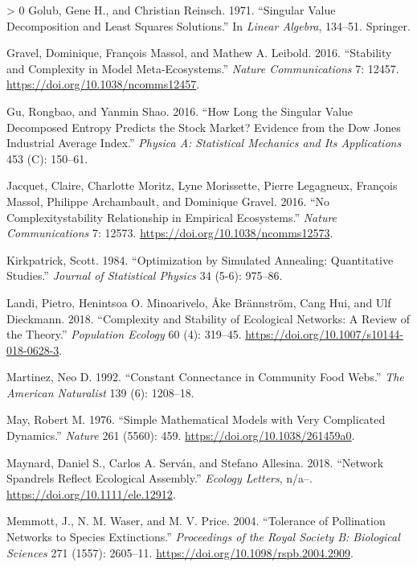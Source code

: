 \documentclass[10pt,oneside]{article}
\newlength{\cslhangindent}
\newenvironment{CSLReferences}[3] %
 {%
  \setlength{\parindent}{0pt}
  \ifodd #1 \everypar{\setlength{\hangindent}{\cslhangindent}}\ignorespaces\fi
  \ifnum #2 > 0
  \setlength{\parskip}{#2\baselineskip}
  \fi
 }%
 {}
\begin{document}
\begin{CSLReferences}{1}{0}
\leavevmode\hypertarget{ref-Golub1971SinVal}{}%
Golub, Gene H., and Christian Reinsch. 1971. {``Singular Value
Decomposition and Least Squares Solutions.''} In \emph{Linear Algebra},
134--51. Springer.

\leavevmode\hypertarget{ref-Gravel2016StaCom}{}%
Gravel, Dominique, François Massol, and Mathew A. Leibold. 2016.
{``Stability and Complexity in Model Meta-Ecosystems.''} \emph{Nature
Communications} 7: 12457. \url{https://doi.org/10.1038/ncomms12457}.

\leavevmode\hypertarget{ref-Gu2016HowLon}{}%
Gu, Rongbao, and Yanmin Shao. 2016. {``How Long the Singular Value
Decomposed Entropy Predicts the Stock Market? Evidence from the Dow
Jones Industrial Average Index.''} \emph{Physica A: Statistical
Mechanics and Its Applications} 453 (C): 150--61.

\leavevmode\hypertarget{ref-Jacquet2016NoCom}{}%
Jacquet, Claire, Charlotte Moritz, Lyne Morissette, Pierre Legagneux,
François Massol, Philippe Archambault, and Dominique Gravel. 2016. {``No
Complexitystability Relationship in Empirical Ecosystems.''}
\emph{Nature Communications} 7: 12573.
\url{https://doi.org/10.1038/ncomms12573}.

\leavevmode\hypertarget{ref-Kirkpatrick1984OptSim}{}%
Kirkpatrick, Scott. 1984. {``Optimization by Simulated Annealing:
Quantitative Studies.''} \emph{Journal of Statistical Physics} 34 (5-6):
975--86.

\leavevmode\hypertarget{ref-Landi2018ComSta}{}%
Landi, Pietro, Henintsoa O. Minoarivelo, Åke Brännström, Cang Hui, and
Ulf Dieckmann. 2018. {``Complexity and Stability of Ecological Networks:
A Review of the Theory.''} \emph{Population Ecology} 60 (4): 319--45.
\url{https://doi.org/10.1007/s10144-018-0628-3}.

\leavevmode\hypertarget{ref-Martinez1992ConCon}{}%
Martinez, Neo D. 1992. {``Constant Connectance in Community Food
Webs.''} \emph{The American Naturalist} 139 (6): 1208--18.

\leavevmode\hypertarget{ref-May1976SimMat}{}%
May, Robert M. 1976. {``Simple Mathematical Models with Very Complicated
Dynamics.''} \emph{Nature} 261 (5560): 459.
\url{https://doi.org/10.1038/261459a0}.

\leavevmode\hypertarget{ref-Maynard2018NetSpa}{}%
Maynard, Daniel S., Carlos A. Serván, and Stefano Allesina. 2018.
{``Network Spandrels Reflect Ecological Assembly.''} \emph{Ecology
Letters}, n/a--. \url{https://doi.org/10.1111/ele.12912}.

\leavevmode\hypertarget{ref-Memmott2004TolPol}{}%
Memmott, J., N. M. Waser, and M. V. Price. 2004. {``Tolerance of
Pollination Networks to Species Extinctions.''} \emph{Proceedings of the
Royal Society B: Biological Sciences} 271 (1557): 2605--11.
\url{https://doi.org/10.1098/rspb.2004.2909}.


\end{CSLReferences}
\end{document}
